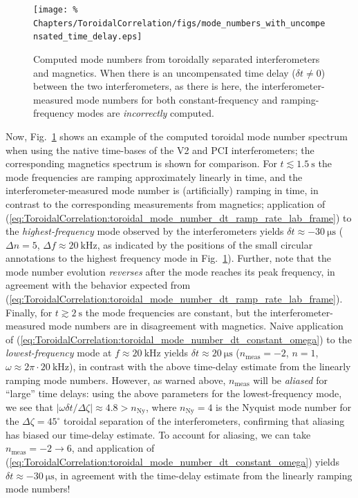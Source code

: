 \begin{figure}
  \centering
  \texttt{[image: \%
    Chapters/ToroidalCorrelation/figs/mode\_numbers\_with\_uncompensated\_time\_delay.eps]}
  \caption{Computed mode numbers from
    toroidally separated interferometers and magnetics.
    When there is an uncompensated time delay ($\delta t \neq 0$)
    between the two interferometers, as there is here,
    the interferometer-measured mode numbers
    for both constant-frequency and ramping-frequency modes
    are \emph{incorrectly} computed.}
\label{fig:ToroidalCorrelation:uncompensated_time_delay}
\end{figure}

Now, Fig.~\ref{fig:ToroidalCorrelation:uncompensated_time_delay} shows an example
of the computed toroidal mode number spectrum
when using the native time-bases of the V2 and PCI interferometers;
the corresponding magnetics spectrum is shown for comparison.
For $t \lesssim \SI{1.5}{\second}$
the mode frequencies are ramping approximately linearly in time, and
the interferometer-measured mode number is (artificially) ramping in time,
in contrast to the corresponding measurements from magnetics;
application of
(\ref{eq:ToroidalCorrelation:toroidal_mode_number_dt_ramp_rate_lab_frame})
to the \emph{highest-frequency} mode observed by the interferometers yields
$\delta t \approx \SI{-30}{\micro\second}$
($\Delta n = 5$, $\Delta f \approx \SI{20}{\kilo\hertz}$,
as indicated by the positions of the small circular annotations
to the highest frequency mode in
Fig.~\ref{fig:ToroidalCorrelation:uncompensated_time_delay}).
Further, note that the mode number evolution \emph{reverses}
after the mode reaches its peak frequency,
in agreement with the behavior expected from
(\ref{eq:ToroidalCorrelation:toroidal_mode_number_dt_ramp_rate_lab_frame}).
Finally, for $t \gtrsim \SI{2}{\second}$
the mode frequencies are constant, but
the interferometer-measured mode numbers are in disagreement with magnetics.
Naive application of
(\ref{eq:ToroidalCorrelation:toroidal_mode_number_dt_constant_omega})
to the \emph{lowest-frequency} mode at $f \approx \SI{20}{\kilo\hertz}$
yields $\delta t \approx \SI{20}{\micro\second}$
($n_{\text{meas}} = -2$, $n = 1$,
$\omega \approx 2 \pi \cdot \SI{20}{\kilo\hertz}$),
in contrast with the above time-delay estimate
from the linearly ramping mode numbers.
However, as warned above,
$n_{\text{meas}}$ will be \emph{aliased} for ``large'' time delays:
using the above parameters for the lowest-frequency mode,
we see that $|\omega \delta t / \Delta \zeta| \approx 4.8 > n_{\text{Ny}}$,
where $n_{\text{Ny}} = 4$ is the Nyquist mode number
for the $\Delta \zeta = 45^{\circ}$ toroidal separation of the interferometers,
confirming that aliasing has biased our time-delay estimate.
To account for aliasing, we can take $n_{\text{meas}} = -2 \rightarrow 6$, and
application of
(\ref{eq:ToroidalCorrelation:toroidal_mode_number_dt_constant_omega}) yields
$\delta t \approx -\SI{30}{\micro\second}$,
in agreement with the time-delay estimate
from the linearly ramping mode numbers!


